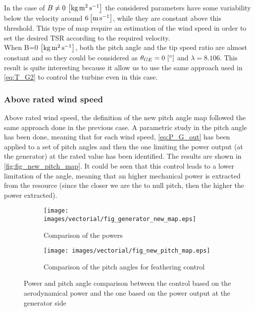 In the case of $B\neq0 \, \left[\si{\kilo\gram\square\meter\per\second}\right]$ the considered parameters have some variability below the velocity around $6 \left[\si{\meter\per\second}\right]$, while they are constant above this threshold. This type of map require an estimation of the wind speed in order to set the desired TSR according to the required velocity.  \\ 
When B=0 $\left[\si{\kilo\gram\square\meter\per\second}\right]$, both the pitch angle and the tip speed ratio are almost constant and so they could be considered as $\theta_{GE}= 0 \, \left[\si{\degree}\right]$ and $\lambda=8.106$. This result is quite interesting because it allow us to use the same approach used in \autoref{eq:T_G2} to control the turbine even in this case. 

\subsubsection{Above rated wind speed}
Above rated wind speed, the definition of the new pitch angle map followed the same approach done in the previous case. A parametric study in the pitch angle has been done, meaning that for each wind speed, \autoref{eq:P_G_out} has been applied to a set of pitch angles and then the one limiting the power output (at the generator) at the rated value has been identified. The results are shown in \autoref{fig:fig_new_pitch_map}. It could be seen that this control leads to a lower limitation of the angle, meaning that an higher mechanical power is extracted from the resource (since the closer we are the to null pitch, then the higher the power extracted).
\begin{figure}[htb]
  \begin{subfigure}{0.5\textwidth}
    \centering
    \texttt{[image: images/vectorial/fig\_generator\_new\_map.eps]}
    \caption{Comparison of the powers}
    \label{fig:fig_generator_new_map}
  \end{subfigure}
  \begin{subfigure}{0.5\textwidth}
    \centering
    \texttt{[image: images/vectorial/fig\_new\_pitch\_map.eps]}
    \caption{Comparison of the pitch angles for feathering control}
    \label{fig:fig_new_pitch_map}
\end{subfigure}
  \caption{Power and pitch angle comparison between the control based on the aerodynamical power and the one based on the power output at the generator side}
  \label{fig:fig_blade_control_gen_side}
\end{figure}
